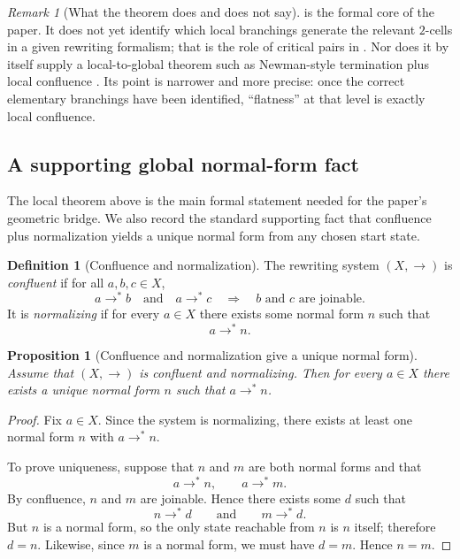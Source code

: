 \documentclass[11pt]{article}
\numberwithin{equation}{section}
\newtheorem{proposition}[theorem]{Proposition}
\theoremstyle{definition}
\newtheorem{definition}[theorem]{Definition}
\theoremstyle{remark}
\newtheorem{remark}[theorem]{Remark}
\begin{document}
\begin{remark}[What the theorem does and does not say]
\label{rem:core-theorem-scope}
 is the formal core of the paper. It does not yet identify which local branchings generate the relevant $2$-cells in a given rewriting formalism; that is the role of critical pairs in . Nor does it by itself supply a local-to-global theorem such as Newman-style termination plus local confluence \cite{Huet1980,BaaderNipkow1998,DershowitzJouannaud1990,Terese2003}. Its point is narrower and more precise: once the correct elementary branchings have been identified, ``flatness'' at that level is exactly local confluence.
\end{remark}

\subsection{A supporting global normal-form fact}

The local theorem above is the main formal statement needed for the paper's geometric bridge. We also record the standard supporting fact that confluence plus normalization yields a unique normal form from any chosen start state.

\begin{definition}[Confluence and normalization]
\label{def:confluence-normalization}
The rewriting system $(X,\to)$ is \emph{confluent} if for all $a,b,c \in X$,
\[
a \to^* b
\quad\text{and}\quad
a \to^* c
\quad\Longrightarrow\quad
b \text{ and } c \text{ are joinable.}
\]
It is \emph{normalizing} if for every $a \in X$ there exists some normal form $n$ such that
\[
a \to^* n.
\]
\end{definition}

\begin{proposition}[Confluence and normalization give a unique normal form]
\label{prop:confluence-normalization-unique-normal-form}
Assume that $(X,\to)$ is confluent and normalizing. Then for every $a \in X$ there exists a unique normal form $n$ such that $a \to^* n$.
\end{proposition}

\begin{proof}
Fix $a \in X$. Since the system is normalizing, there exists at least one normal form $n$ with $a \to^* n$.

To prove uniqueness, suppose that $n$ and $m$ are both normal forms and that
\[
a \to^* n,
\qquad
a \to^* m.
\]
By confluence, $n$ and $m$ are joinable. Hence there exists some $d$ such that
\[
n \to^* d
\qquad\text{and}\qquad
m \to^* d.
\]
But $n$ is a normal form, so the only state reachable from $n$ is $n$ itself; therefore $d=n$. Likewise, since $m$ is a normal form, we must have $d=m$. Hence $n=m$.
\end{proof}
\end{document}
